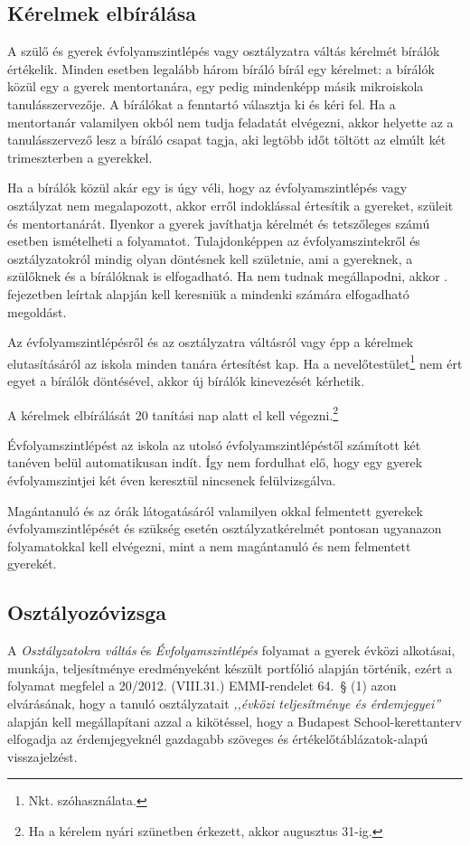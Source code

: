 
\subsection{Kérelmek elbírálása}

A szülő és gyerek évfolyamszintlépés vagy osztályzatra váltás kérelmét bírálók értékelik. Minden esetben legalább három bíráló bírál egy kérelmet: a bírálók közül egy a gyerek mentortanára, egy pedig mindenképp másik mikroiskola tanulásszervezője. A bírálókat a fenntartó választja ki és kéri fel. Ha a mentortanár valamilyen okból nem tudja feladatát elvégezni, akkor helyette az a tanulásszervező lesz a bíráló csapat tagja, aki legtöbb időt töltött az elmúlt két trimeszterben a gyerekkel.

Ha a bírálók közül akár egy is úgy véli, hogy az évfolyamszintlépés vagy osztályzat nem megalapozott, akkor erről indoklással értesítik a gyereket, szüleit és mentortanárát. Ilyenkor a gyerek javíthatja kérelmét és tetszőleges számú esetben ismételheti a folyamatot. Tulajdonképpen az évfolyamszintekről és osztályzatokról mindig olyan döntésnek kell születnie, ami a gyereknek, a szülőknek és a bírálóknak is elfogadható. Ha nem tudnak megállapodni, akkor . fejezetben leírtak alapján kell keresniük a mindenki számára elfogadható megoldást.

Az évfolyamszintlépésről és az osztályzatra váltásról vagy épp a kérelmek elutasításáról az iskola minden tanára értesítést kap. Ha a nevelőtestület\footnote{Nkt. szóhasználata.} nem ért egyet a bírálók döntésével, akkor új bírálók kinevezését kérhetik.

A kérelmek elbírálását 20 tanítási nap alatt el kell végezni.\footnote{Ha a kérelem nyári szünetben érkezett, akkor augusztus 31-ig.}

Évfolyamszintlépést az iskola az utolsó évfolyamszintlépéstől számított két tanéven belül automatikusan indít. Így nem fordulhat elő, hogy egy gyerek évfolyamszintjei két éven keresztül nincsenek felülvizsgálva.

Magántanuló és az órák látogatásáról valamilyen okkal felmentett gyerekek évfolyamszintlépését és szükség esetén osztályzatkérelmét pontosan ugyanazon folyamatokkal kell elvégezni, mint a nem magántanuló és nem felmentett gyerekét.

\subsection{Osztályozóvizsga}
A \emph{Osztályzatokra váltás} és \emph{Évfolyamszintlépés} folyamat a gyerek évközi alkotásai, munkája, teljesítménye eredményeként készült portfólió alapján történik, ezért a folyamat megfelel a 20/2012. (VIII.31.) EMMI-rendelet 64.~§ (1) azon elvárásának, hogy a tanuló osztályzatait \emph{,,évközi teljesítménye és érdemjegyei''} alapján kell megállapítani azzal a kikötéssel, hogy a Budapest School-kerettanterv elfogadja az érdemjegyeknél gazdagabb szöveges és értékelőtáblázatok-alapú visszajelzést.

